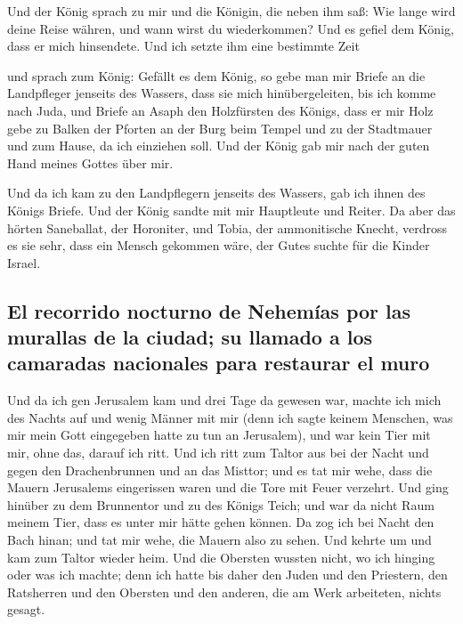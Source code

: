  Und der König sprach zu mir und die Königin, die neben
ihm saß: Wie lange wird deine Reise währen, und wann wirst du
wiederkommen? Und es gefiel dem König, dass er mich hinsendete. Und ich
setzte ihm eine bestimmte Zeit

 und sprach zum König: Gefällt es dem König, so gebe man
mir Briefe an die Landpfleger jenseits des Wassers, dass sie mich
hinübergeleiten, bis ich komme nach Juda,  und Briefe an
Asaph den Holzfürsten des Königs, dass er mir Holz gebe zu Balken der
Pforten an der Burg beim Tempel und zu der Stadtmauer und zum Hause, da
ich einziehen soll. Und der König gab mir nach der guten Hand meines
Gottes über mir.

 Und da ich kam zu den Landpflegern jenseits des Wassers,
gab ich ihnen des Königs Briefe. Und der König sandte mit mir Hauptleute
und Reiter.  Da aber das hörten Saneballat, der
Horoniter, und Tobia, der ammonitische Knecht, verdross es sie sehr,
dass ein Mensch gekommen wäre, der Gutes suchte für die Kinder Israel.

\hypertarget{el-recorrido-nocturno-de-nehemuxedas-por-las-murallas-de-la-ciudad-su-llamado-a-los-camaradas-nacionales-para-restaurar-el-muro}{%
\subsection{El recorrido nocturno de Nehemías por las murallas de la
ciudad; su llamado a los camaradas nacionales para restaurar el
muro}\label{el-recorrido-nocturno-de-nehemuxedas-por-las-murallas-de-la-ciudad-su-llamado-a-los-camaradas-nacionales-para-restaurar-el-muro}}

 Und da ich gen Jerusalem kam und drei Tage da gewesen
war,  machte ich mich des Nachts auf und wenig Männer mit
mir (denn ich sagte keinem Menschen, was mir mein Gott eingegeben hatte
zu tun an Jerusalem), und war kein Tier mit mir, ohne das, darauf ich
ritt.  Und ich ritt zum Taltor aus bei der Nacht und
gegen den Drachenbrunnen und an das Misttor; und es tat mir wehe, dass
die Mauern Jerusalems eingerissen waren und die Tore mit Feuer verzehrt.
 Und ging hinüber zu dem Brunnentor und zu des Königs
Teich; und war da nicht Raum meinem Tier, dass es unter mir hätte gehen
können.  Da zog ich bei Nacht den Bach hinan; und tat mir
wehe, die Mauern also zu sehen. Und kehrte um und kam zum Taltor wieder
heim.  Und die Obersten wussten nicht, wo ich hinging
oder was ich machte; denn ich hatte bis daher den Juden und den
Priestern, den Ratsherren und den Obersten und den anderen, die am Werk
arbeiteten, nichts gesagt.

